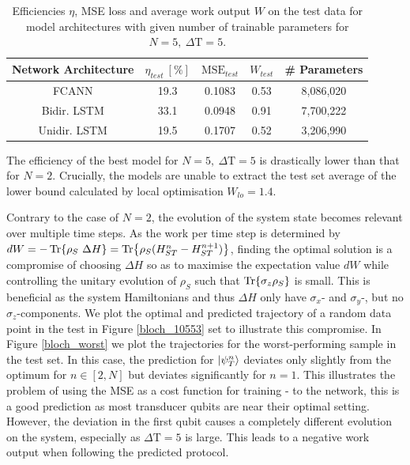 \begin{table}[h]
	\centering
	\begin{tabular}{ c | c | c | c | c}
		Network Architecture & $\eta_{test} \ [\%]$ & $\mathrm{MSE}_{test}$ & $W_{test}$ & \# Parameters \\
		\hline
		FCANN        & 19.3 & 0.1083 & 0.53 & 8,086,020 \\
		Bidir. LSTM  & 33.1 & 0.0948 & 0.91 & 7,700,222 \\
		Unidir. LSTM & 19.5 & 0.1707 & 0.52 & 3,206,990\\
	\end{tabular}
	\caption{Efficiencies $\eta$, MSE loss and average work output $W$ on the test data for model architectures with given number of trainable parameters for $N=5, \ \Delta \mathrm{T} = 5$.}
	\label{n5efftable}
\end{table}

The efficiency of the best model for $N=5, \ \Delta \mathrm{T} = 5$ is drastically lower than that for $N=2$.
Crucially, the models are unable to extract the test set average of the lower bound calculated by local optimisation $W_{lo} = 1.4$.

Contrary to the case of $N=2$, the evolution of the system state becomes relevant over multiple time steps.
As the work per time step is determined by $dW = -\Tr{\rho_S \ \Delta H} = \Tr{\rho_S (H_{ST}^n - H_{ST}^{n+1})}$, finding the optimal solution is a compromise of choosing $\Delta H$ so as to maximise the expectation value $dW$ while controlling the unitary evolution of $\rho_S$ such that $\Tr{\sigma_z \rho_S}$ is small.
This is beneficial as the system Hamiltonians and thus $\Delta H$ only have $\sigma_x$- and $\sigma_y$-, but no $\sigma_z$-components.
We plot the optimal and predicted trajectory of a random data point in the test in Figure \ref{bloch_10553} set to illustrate this compromise.
In Figure \ref{bloch_worst} we plot the trajectories for the worst-performing sample in the test set.
In this case, the prediction for $\ket{\psi_T^n}$ deviates only slightly from the optimum for $n \in [2, N]$ but deviates significantly for $n=1$.
This illustrates the problem of using the MSE as a cost function for training - to the network, this is a good prediction as most transducer qubits are near their optimal setting.
However, the deviation in the first qubit causes a completely different evolution on the system, especially as $\Delta \mathrm{T} = 5$ is large.
This leads to a negative work output when following the predicted protocol.

